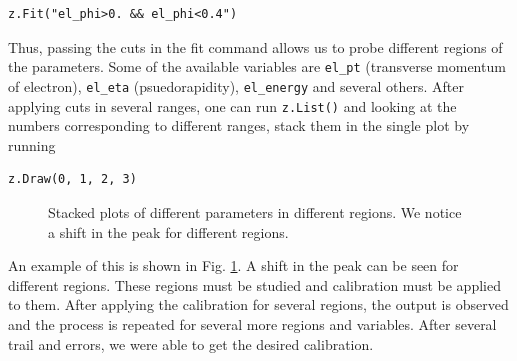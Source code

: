 \documentclass[a4paper]{report}
\numberwithin{equation}{section}
\begin{document}
\begin{verbatim}
z.Fit("el_phi>0. && el_phi<0.4")
\end{verbatim}
Thus, passing the cuts in the fit command allows us to probe different regions of the parameters. Some of the available variables are \texttt{el\_pt} (transverse momentum of electron), \texttt{el\_eta} (psuedorapidity), \texttt{el\_energy} and several others. After applying cuts in several ranges, one can run \texttt{z.List()} and looking at the numbers corresponding to different ranges, stack them in the single plot by running

\begin{verbatim}
z.Draw(0, 1, 2, 3)
\end{verbatim}

\begin{figure}[htb!]
	\centering
	\quad
	\centering
	\caption{Stacked plots of different parameters in different regions. We notice a shift in the peak for different regions.}
	\label{fig:region-stack}
\end{figure}

An example of this is shown in Fig. \ref{fig:region-stack}. A shift in the peak can be seen for different regions. These regions must be studied and calibration must be applied to them. After applying the calibration for several regions, the output is observed and the process is repeated for several more regions and variables. After several trail and errors, we were able to get the desired calibration. 
\end{document}
